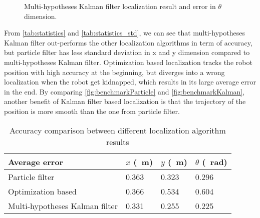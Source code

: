 \begin{figure}[!htbp]
  \centering
    \begin{subfigure}[b]{0.9\textwidth}
      
    \end{subfigure}
    \begin{subfigure}[b]{0.9\textwidth}
      
    \end{subfigure}
  \caption{Multi-hypotheses Kalman filter localization result and error in $\theta$ dimension.}
 \label{fig:benchmarkKalman2}
\end{figure}
From \autoref{tab:statistics} and \ref{tab:statistics_std}, we can see that multi-hypotheses Kalman filter out-performs the other localization algorithms in term of accuracy, but particle filter has less standard deviation in x and y dimension compared to multi-hypotheses Kalman filter. Optimization based localization tracks the robot position with high accuracy at the beginning, but diverges into a wrong localization when the robot get kidnapped, which results in its large average error in the end.
By comparing \autoref{fig:benchmarkParticle} and \ref{fig:benchmarkKalman}, another benefit of Kalman filter based localization is that the trajectory of the position is more smooth than the one from particle filter.
\begin{table}[h!]
  \centering
  \caption{Accuracy comparison between different localization algorithm results}
  \label{tab:statistics}
  \begin{adjustbox}{max width=\textwidth}
    \begin{tabular}{l|l|l|l}
      Average error  & $x$ (\SI{}{\meter})                       & $y$  (\SI{}{\meter})                         & $\theta$  (\SI{}{\radian})           \\\hline
      Particle filter                & 0.363  & 0.323 & 0.296 \\ \hline
      Optimization based             & 0.366  & 0.534 & 0.604   \\ \hline
      Multi-hypotheses Kalman filter & 0.331  & 0.255 & 0.225  %
    \end{tabular}
  \end{adjustbox}
\end{table}

